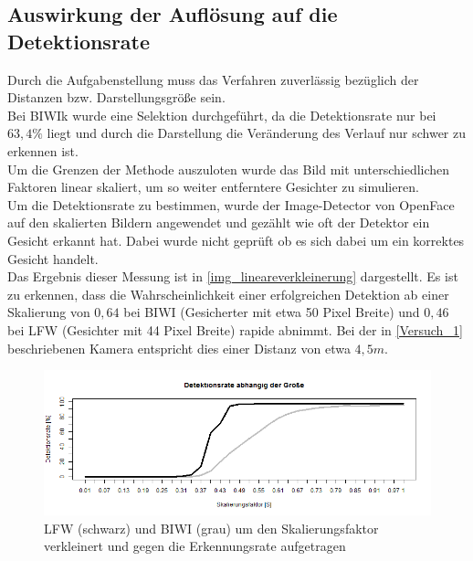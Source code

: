 \subsection{Auswirkung der Auflösung auf die Detektionsrate}
Durch die Aufgabenstellung muss das Verfahren zuverlässig bezüglich der Distanzen bzw. Darstellungsgröße sein.\\
Bei BIWIk wurde eine Selektion durchgeführt, da die Detektionsrate nur bei $63,4\%$ liegt und durch die Darstellung die Veränderung des Verlauf nur schwer zu erkennen ist.\\
Um die Grenzen der Methode auszuloten wurde das Bild mit unterschiedlichen Faktoren linear skaliert, um so weiter entferntere Gesichter zu simulieren.\\
Um die Detektionsrate zu bestimmen, wurde der Image-Detector von OpenFace auf den skalierten Bildern angewendet und gezählt wie oft der Detektor ein Gesicht erkannt hat. Dabei wurde nicht geprüft ob es sich dabei um ein korrektes Gesicht handelt.\\
Das Ergebnis dieser Messung ist in \autoref{img_lineareverkleinerung} dargestellt. Es ist zu erkennen, dass die Wahrscheinlichkeit einer erfolgreichen Detektion ab einer Skalierung von $0,64$ bei BIWI (Gesicherter mit etwa 50 Pixel Breite) und $0,46$ bei LFW (Gesichter mit 44 Pixel Breite) rapide abnimmt. Bei der in \autoref{Versuch_1} beschriebenen Kamera entspricht dies einer Distanz von etwa $4,5m$.\\
\begin{figure}[p]
	\centering
	\includegraphics[width=\linewidth]{img_Skalierung/Gesicht_Rate}
	\caption{LFW \cite{database_Face} (schwarz) und BIWI \cite{database_Face_Ori} (grau) um den Skalierungsfaktor verkleinert und gegen die Erkennungsrate aufgetragen}
	\label{img_lineareverkleinerung}
\end{figure}

